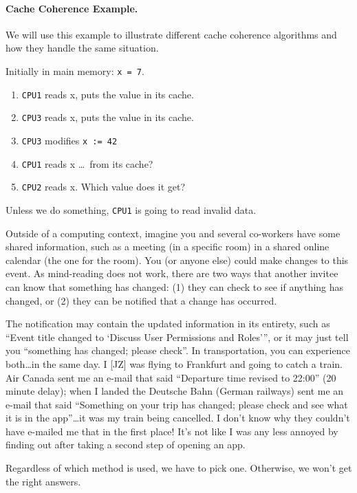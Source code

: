 \paragraph{Cache Coherence Example.} We will use this example to illustrate
different cache coherence algorithms and how they handle the same situation.

Initially in main memory: {\tt x = 7}.

  \begin{enumerate}[noitemsep]
    \item {\tt CPU1} reads x, puts the value in its cache.
    \item {\tt CPU3} reads x, puts the value in its cache.
    \item {\tt CPU3} modifies {\tt x := 42}
    \item {\tt CPU1} reads x \ldots ~from its cache?
    \item {\tt CPU2} reads x. Which value does it get?
  \end{enumerate}

Unless we do something, {\tt CPU1} is going to read invalid data.
  
Outside of a computing context, imagine you and several co-workers have some shared information, such as a meeting (in a specific room) in a shared online calendar (the one for the room). You (or anyone else) could make changes to this event. As mind-reading does not work, there are two ways that another invitee can know that something has changed: (1) they can check to see if anything has changed, or (2) they can be notified that a change has occurred. 

The notification may contain the updated information in its entirety, such as ``Event title changed to `Discuss User Permissions and Roles''', or it may just tell you ``something has changed; please check''. In transportation, you can experience both\ldots in the same day. I [JZ] was flying to Frankfurt and going to catch a train. Air Canada sent me an e-mail that said ``Departure time revised to 22:00'' (20 minute delay); when I landed the Deutsche Bahn (German railways) sent me an e-mail that said ``Something on your trip has changed; please check and see what it is in the app''\ldots it was my train being cancelled. I don't know why they couldn't have e-mailed me that in the first place! It's not like I was any less annoyed by finding out after taking a second step of opening an app.

Regardless of which method is used, we have to pick one. Otherwise, we won't get the right answers.


